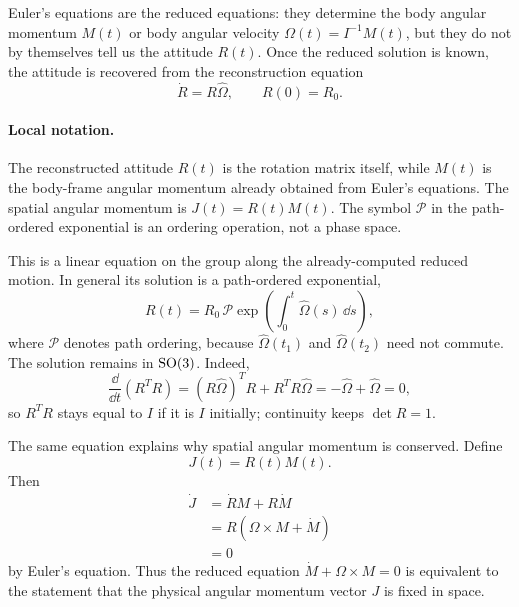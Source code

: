 Euler's equations are the reduced equations: they determine the body angular
momentum \(M(t)\) or body angular velocity \(\Omega(t)=I^{-1}M(t)\), but they
do not by themselves tell us the attitude \(R(t)\). Once the reduced solution
is known, the attitude is recovered from the reconstruction equation
\[
  \boxed{
  \dot R=R\widehat\Omega,\qquad R(0)=R_0.
  }
\]

\paragraph{Local notation.}
The reconstructed attitude \(R(t)\) is the rotation matrix itself, while
\(M(t)\) is the body-frame angular momentum already obtained from Euler's
equations.  The spatial angular momentum is \(J(t)=R(t)M(t)\).  The symbol
\(\mathcal P\) in the path-ordered exponential is an ordering operation, not a
phase space.

This is a linear equation on the group along the already-computed reduced
motion. In general its solution is a path-ordered exponential,
\[
  R(t)=R_0\,\mathcal P
  \exp\left(\int_0^t\widehat\Omega(s)\,\dd s\right),
\]
where \(\mathcal P\) denotes path ordering, because
\(\widehat\Omega(t_1)\) and \(\widehat\Omega(t_2)\) need not commute.
The solution remains in \(\operatorname{SO}(3)\). Indeed,
\[
  \frac{\dd}{\dd t}(R^TR)
  =
  (R\widehat\Omega)^TR+R^TR\widehat\Omega
  =
  -\widehat\Omega+\widehat\Omega=0,
\]
so \(R^TR\) stays equal to \(I\) if it is \(I\) initially; continuity keeps
\(\det R=1\).

The same equation explains why spatial angular momentum is conserved. Define
\[
  J(t)=R(t)M(t).
\]
Then
\[
\begin{aligned}
  \dot J
  &=
  \dot R M+R\dot M\\
  &=
  R(\Omega\times M+\dot M)\\
  &=
  0
\end{aligned}
\]
by Euler's equation. Thus the reduced equation \(\dot M+\Omega\times M=0\) is
equivalent to the statement that the physical angular momentum vector \(J\) is
fixed in space.

